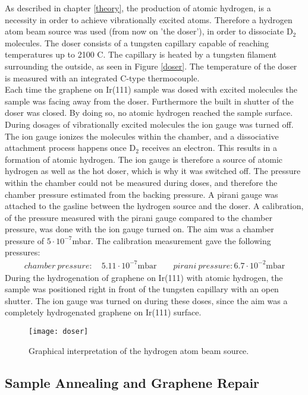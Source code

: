 As described in chapter \ref{theory}, the production of atomic hydrogen, is a necessity in order to achieve vibrationally excited atoms. Therefore a hydrogen atom beam source was used (from now on 'the doser'), in order to dissociate D$_2$ molecules. The doser consists of a tungsten capillary capable of reaching temperatures up to 2100 \degree C.\cite{HABS} The capillary is heated by a tungsten filament surrounding the outside, as seen in Figure \ref{doser}. The temperature of the doser is measured with an integrated C-type thermocouple.\\
Each time the graphene on Ir(111) sample was dosed with excited molecules the sample was facing away from the doser. Furthermore the built in shutter of the doser was closed. By doing so, no atomic hydrogen reached the sample surface. During dosages of vibrationally excited molecules the ion gauge was turned off. The ion gauge ionizes the molecules within the chamber, and a dissociative attachment process happens once D$_2$ receives an electron. This results in a formation of atomic hydrogen.\cite{PhysRevLett.60.337} The ion gauge is therefore a source of atomic hydrogen as well as the hot doser, which is why it was switched off. The pressure within the chamber could not be measured during doses, and therefore the chamber pressure estimated from the backing pressure. A pirani gauge was attached to the gasline between the hydrogen source and the doser. A calibration, of the pressure measured with the pirani gauge compared to the chamber pressure, was done with the ion gauge turned on. The aim was a chamber pressure of $5\cdot 10^{-7}$mbar. The calibration measurement gave the following pressures:
\begin{align}
chamber\: pressure: \quad 5.11 \cdot 10^{-7} \text{mbar} \qquad pirani\: pressure: 6.7 \cdot 10^{-2} \text{mbar}
\end{align}
During the hydrogenation of graphene on Ir(111) with atomic hydrogen, the sample was positioned right in front of the tungsten capillary with an open shutter. The ion gauge was turned on during these doses, since the aim was a completely hydrogenated graphene on Ir(111) surface.

\begin{figure}
  \centering
  \texttt{[image: doser]}
  \caption{Graphical interpretation of the hydrogen atom beam source.\cite{HABS}}
  \label{HABS}
\end{figure}

\subsection{Sample Annealing and Graphene Repair}

